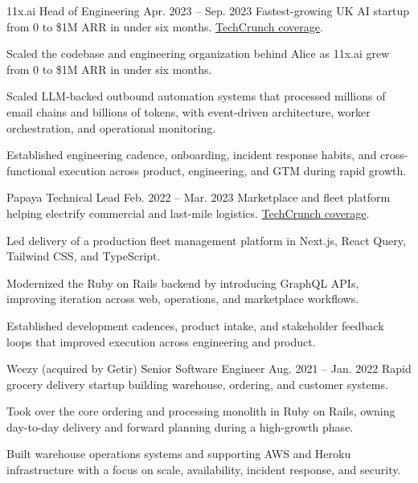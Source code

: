 \ResumeJob
  {11x.ai}
  {Head of Engineering}
  {Apr. 2023 -- Sep. 2023}
  {Fastest-growing UK AI startup from 0 to \$1M ARR in under six months. \href{https://techcrunch.com/2023/08/11/11xai-closes-2-million-pre-seed-to-create-autonomous-ai-workers/}{TechCrunch coverage}.}
\begin{ResumeList}
  \item Scaled the codebase and engineering organization behind Alice as 11x.ai grew from 0 to \$1M ARR in under six months.
  \item Scaled LLM-backed outbound automation systems that processed millions of email chains and billions of tokens, with event-driven architecture, worker orchestration, and operational monitoring.
  \item Established engineering cadence, onboarding, incident response habits, and cross-functional execution across product, engineering, and GTM during rapid growth.
\end{ResumeList}

\ResumeJob
  {Papaya}
  {Technical Lead}
  {Feb. 2022 -- Mar. 2023}
  {Marketplace and fleet platform helping electrify commercial and last-mile logistics. \href{https://techcrunch.com/2022/09/27/papaya-wants-to-help-electrify-last-mile-logistics-in-europe/}{TechCrunch coverage}.}
\begin{ResumeList}
  \item Led delivery of a production fleet management platform in Next.js, React Query, Tailwind CSS, and TypeScript.
  \item Modernized the Ruby on Rails backend by introducing GraphQL APIs, improving iteration across web, operations, and marketplace workflows.
  \item Established development cadences, product intake, and stakeholder feedback loops that improved execution across engineering and product.
\end{ResumeList}

\ResumeJob
  {Weezy (acquired by Getir)}
  {Senior Software Engineer}
  {Aug. 2021 -- Jan. 2022}
  {Rapid grocery delivery startup building warehouse, ordering, and customer systems.}
\begin{ResumeList}
  \item Took over the core ordering and processing monolith in Ruby on Rails, owning day-to-day delivery and forward planning during a high-growth phase.
  \item Built warehouse operations systems and supporting AWS and Heroku infrastructure with a focus on scale, availability, incident response, and security.
\end{ResumeList}

